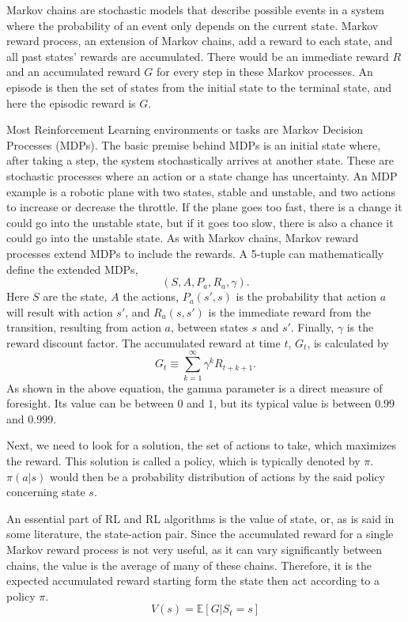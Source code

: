 Markov chains are stochastic models that describe possible events in a system where the probability of an event only depends on the current state. Markov reward process, an extension of Markov chains, add a reward to each state, and all past states' rewards are accumulated. There would be an immediate reward $R$ and an accumulated reward $G$ for every step in these Markov processes. An episode is then the set of states from the initial state to the terminal state, and here the episodic reward is $G$.

Most Reinforcement Learning environments or tasks are Markov Decision Processes (MDPs). The basic premise behind MDPs is an initial state where, after taking a step, the system stochastically arrives at another state. These are stochastic processes where an action or a state change has uncertainty. An MDP example is a robotic plane with two states, stable and unstable, and two actions to increase or decrease the throttle. If the plane goes too fast, there is a change it could go into the unstable state, but if it goes too slow, there is also a chance it could go into the unstable state. As with Markov chains, Markov reward processes extend MDPs to include the rewards.
A 5-tuple can mathematically define the extended MDPs, $$(S, A, P_a, R_a, \gamma).$$ Here $S$ are the state, $A$ the actions, $P_a(s',s)$ is the probability that action $a$ will result with action $s'$, and $R_a(s,s')$ is the immediate reward from the transition, resulting from action $a$, between states $s$ and $s'$. Finally, $\gamma$ is the reward discount factor. The accumulated reward at time $t$, $G_t$, is calculated by 
\begin{equation} \label{eq:discountedreward}
	G_t\equiv \sum_{k=1}^\infty \gamma^k R_{t+k+1}.
\end{equation} As shown in the above equation, the gamma parameter is a direct measure of foresight. Its value can be between $0$ and $1$, but its typical value is between $0.99$ and $0.999$. 

Next, we need to look for a solution, the set of actions to take, which maximizes the reward. This solution is called a policy, which is typically denoted by $\pi$. $\pi(a|s)$ would then be a probability distribution of actions by the said policy concerning state $s$. 

An essential part of RL and RL algorithms is the value of state, or, as is said in some literature, the state-action pair. Since the accumulated reward for a single Markov reward process is not very useful, as it can vary significantly between chains, the value is the average of many of these chains. Therefore, it is the expected accumulated reward starting form the state then act according to a policy $\pi$. $$V(s)=\mathbb{E}[G|S_t=s]$$ 

